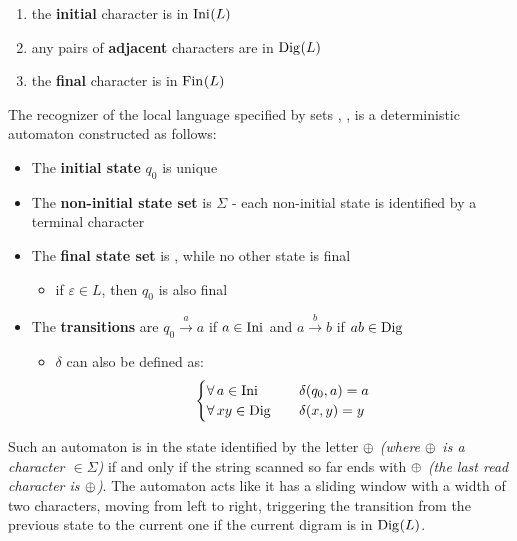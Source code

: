 \documentclass[english]{article}
\begin{document}
\begin{enumerate}
  \item the \textbf{initial} character is in \(\text{Ini}\hspace{0.1ex}(L)\)
  \item any pairs of \textbf{adjacent} characters are in \(\text{Dig}\hspace{0.1ex}(L)\)
  \item the \textbf{final} character is in \(\text{Fin}\hspace{0.1ex}(L)\)
\end{enumerate}

\bigskip
The recognizer of the local language specified by sets \Ini, \Fin, \Dig is a deterministic automaton constructed as follows:

\begin{itemize}
  \item The \textbf{initial state} \(q_0\) is unique
  \item The \textbf{non-initial state set} is \(\Sigma\) - each non-initial state is identified by a terminal character
  \item The \textbf{final state set} is \Fin, while no other state is final
        \begin{itemize}
          \item if \(\varepsilon \in L\), then \(q_0\) is also final
        \end{itemize}
  \item The \textbf{transitions} are \(q_0 \xrightarrow{a} a\) if \(a \in \text{Ini}\hspace{0.1ex}\) and \(a \xrightarrow{b} b\) if \(ab \in \text{Dig}\hspace{0.1ex}\)
        \begin{itemize}
          \item \(\delta\) can also be defined as:
                \[\begin{cases}
                    \forall \, a \in \text{Ini}\hspace{0.1ex} \quad  & \delta(q_0, a) = a \\
                    \forall \, xy \in \text{Dig}\hspace{0.1ex} \quad & \delta(x, y) = y
                  \end{cases} \]
        \end{itemize}
\end{itemize}

Such an automaton is in the state identified by the letter \(\oplus\) \textit{(where \(\oplus\) is a character \(\in \Sigma\))} if and only if the string scanned so far ends with \(\oplus\) \textit{(the last read character is \(\oplus\))}.
The automaton acts like it has a sliding window with a width of two characters, moving from left to right, triggering the transition from the previous state to the current one if the current digram is in \(\text{Dig}\hspace{0.1ex}(L)\).
\end{document}
